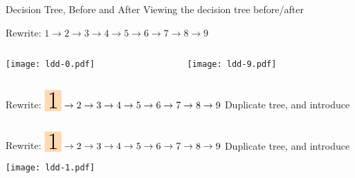 \begin{frame}{Decision Tree, Before and After}
  Viewing the decision tree before/after

  \medskip
  
  Rewrite: $1 \to 2\to 3\to 4\to 5\to 6\to 7\to 8\to 9$

  \medskip
  
  \begin{columns}
    \begin{column}{0.5\textwidth}
      \texttt{[image: ldd-0.pdf]}
    \end{column}
    \begin{column}{0.5\textwidth}  %
      \texttt{[image: ldd-9.pdf]}
    \end{column}
  \end{columns}
\end{frame}


\def\myLeftArrow{\smash{
  \begin{tikzpicture}[baseline=-2mm]
    \useasboundingbox (-2,0);
    \node[single arrow,draw=black,fill=red!10,minimum width=5cm,minimum height=7cm,shape border rotate=180] at (0,-1) {};
  \end{tikzpicture}
}}


\begin{frame}{Rewrite: $\colorbox{orange!30}{\Huge 1}\to 2\to 3\to 4\to 5\to 6\to 7\to 8\to 9$}%
  Duplicate tree, and introduce \colorbox{pink!30}{}

  \begin{columns}
    \begin{column}{0.5\textwidth}
    \end{column}
    \begin{column}{0.5\textwidth}  %
    \end{column}    
  \end{columns}
\end{frame}

\begin{frame}{Rewrite: $\colorbox{orange!30}{\Huge 1}\to 2\to 3\to 4\to 5\to 6\to 7\to 8\to 9$}%
  Duplicate tree, and introduce \colorbox{pink!30}{}
  
  \centerline{  \texttt{[image: ldd-1.pdf]}}
\end{frame}

